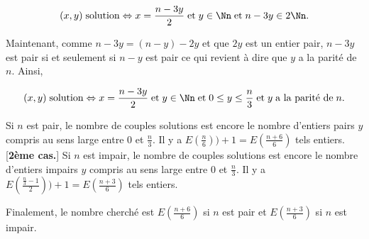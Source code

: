 {{$$(x,y)\;\mbox{solution}\Leftrightarrow x=\frac{n-3y}{2}\;\mbox{et}\;y\in\Nn\;\mbox{et}\;n-3y\in2\Nn.$$

Maintenant, comme $n-3y=(n-y)-2y$ et que $2y$ est un entier pair, $n-3y$ est pair si et seulement si $n-y$ est pair ce
qui revient à dire que $y$ a la parité de $n$. Ainsi,

$$(x,y)\;\mbox{solution}\Leftrightarrow x=\frac{n-3y}{2}\;\mbox{et}\;y\in\Nn\;\mbox{et}\;0\leq y\leq
\frac{n}{3}\;\mbox{et}\;y\;\mbox{a la parité de}\;n.$$

\begin{itemize}
 Si $n$ est pair, le nombre de couples solutions est encore le nombre d'entiers pairs $y$
compris au sens large entre $0$ et $\frac{n}{3}$. Il y a $E(\frac{n}{6}))+1=E(\frac{n+6}{6})$ tels entiers.
[\textbf{2ème cas.}] Si $n$ est impair, le nombre de couples solutions est encore le nombre d'entiers impairs $y$
compris au sens large entre $0$ et $\frac{n}{3}$. Il y a  $E(\frac{\frac{n}{3}-1}{2}))+1=E(\frac{n+3}{6})$ tels
entiers.
\end{itemize}
Finalement, le nombre cherché est $E(\frac{n+6}{6})$ si $n$ est pair et $E(\frac{n+3}{6})$ si $n$ est impair.
}
}
